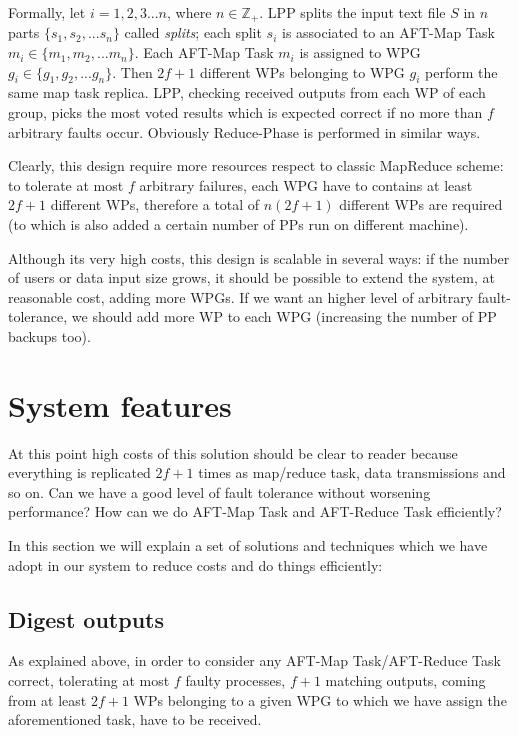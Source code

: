 \documentclass[sigchi]{acmart}
\begin{document}
Formally, let $i = 1,2,3...n$, where $n \in \mathbb{Z}_+$. LPP splits the input text file $S$ in $n$ parts $\lbrace s_1, s_2, ... s_n \rbrace$ called \textit{splits}; each split $s_i$ is associated to an AFT-Map Task $m_i \in \lbrace m_1, m_2, ... m_n \rbrace$. Each AFT-Map Task $m_i$ is assigned to WPG $g_i \in \lbrace g_1, g_2, ... g_n \rbrace$. Then $2f+1$ different WPs belonging to WPG $g_i$ perform the same map task replica. LPP, checking received outputs from each WP of each group, picks the most voted results which is expected correct if no more than $f$ arbitrary faults occur. Obviously Reduce-Phase is performed in similar ways.

Clearly, this design require more resources respect to classic MapReduce scheme: to tolerate at most $f$ arbitrary failures, each WPG have to contains at least $2f+1$ different WPs, therefore a total of $n(2f+1)$ different WPs are required (to which is also added a certain number of PPs run on different machine).

Although its very high costs, this design is scalable in several ways: if the number of users or data input size grows, it should be possible to extend the system, at reasonable cost, adding more WPGs. If we want an higher level of arbitrary fault-tolerance, we should add more WP to each WPG (increasing the number of PP backups too).

\section{System features}

At this point high costs of this solution should be clear to reader because everything is replicated $2f + 1$ times as map/reduce task, data transmissions and so on. Can we have a good level of fault tolerance without worsening performance? How can we do AFT-Map Task and AFT-Reduce Task efficiently? 

In this section we will explain a set of solutions and techniques which we have adopt in our system to reduce costs and do things efficiently:

\subsection{Digest outputs} As explained above, in order to consider any AFT-Map Task/AFT-Reduce Task correct, tolerating at most $f$ faulty processes, $f + 1$ matching outputs, coming from at least $2f + 1$ WPs belonging to a given WPG to which we have assign the aforementioned task, have to be received. 
\end{document}
